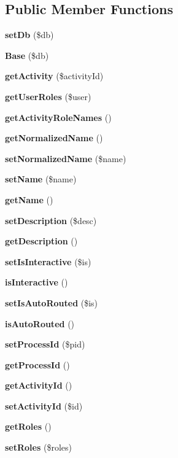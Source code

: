 \subsection*{Public Member Functions}
\begin{CompactItemize}
\item 
{}
{\bf set\-Db} (\$db)\label{classBaseActivity_a0}

\item 
{}
{\bf Base} (\$db)\label{classBaseActivity_a1}

\item 
{\bf get\-Activity} (\$activity\-Id)
\item 
{\bf get\-User\-Roles} (\$user)
\item 
{\bf get\-Activity\-Role\-Names} ()
\item 
{\bf get\-Normalized\-Name} ()
\item 
{\bf set\-Normalized\-Name} (\$name)
\item 
{\bf set\-Name} (\$name)
\item 
{\bf get\-Name} ()
\item 
{\bf set\-Description} (\$desc)
\item 
{\bf get\-Description} ()
\item 
{\bf set\-Is\-Interactive} (\$is)
\item 
{\bf is\-Interactive} ()
\item 
{\bf set\-Is\-Auto\-Routed} (\$is)
\item 
{\bf is\-Auto\-Routed} ()
\item 
{\bf set\-Process\-Id} (\$pid)
\item 
{\bf get\-Process\-Id} ()
\item 
{\bf get\-Activity\-Id} ()
\item 
{\bf set\-Activity\-Id} (\$id)
\item 
{\bf get\-Roles} ()
\item 
{\bf set\-Roles} (\$roles)
\end{CompactItemize}
